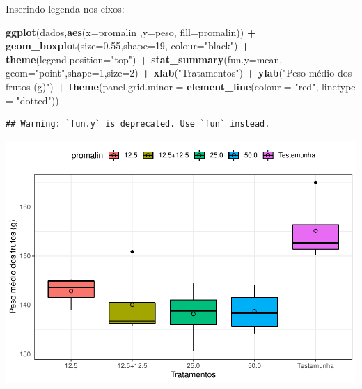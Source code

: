 \documentclass[
]{book}
\newenvironment{Shaded}{\begin{snugshade}}{\end{snugshade}}
\newcommand{\DataTypeTok}[1]{\textcolor[rgb]{0.13,0.29,0.53}{#1}}
\newcommand{\DecValTok}[1]{\textcolor[rgb]{0.00,0.00,0.81}{#1}}
\newcommand{\FloatTok}[1]{\textcolor[rgb]{0.00,0.00,0.81}{#1}}
\newcommand{\KeywordTok}[1]{\textcolor[rgb]{0.13,0.29,0.53}{\textbf{#1}}}
\newcommand{\NormalTok}[1]{#1}
\newcommand{\OperatorTok}[1]{\textcolor[rgb]{0.81,0.36,0.00}{\textbf{#1}}}
\newcommand{\StringTok}[1]{\textcolor[rgb]{0.31,0.60,0.02}{#1}}
\begin{document}
Inserindo legenda nos eixos:

\begin{Shaded}
\begin{Highlighting}[]
\KeywordTok{ggplot}\NormalTok{(dados,}\KeywordTok{aes}\NormalTok{(}\DataTypeTok{x=}\NormalTok{promalin ,}\DataTypeTok{y=}\NormalTok{peso, }\DataTypeTok{fill=}\NormalTok{promalin)) }\OperatorTok{+}\StringTok{ }
\StringTok{      }\KeywordTok{geom_boxplot}\NormalTok{(}\DataTypeTok{size=}\FloatTok{0.55}\NormalTok{,}\DataTypeTok{shape=}\DecValTok{19}\NormalTok{, }\DataTypeTok{colour=}\StringTok{"black"}\NormalTok{) }\OperatorTok{+}\StringTok{ }
\StringTok{      }\KeywordTok{theme}\NormalTok{(}\DataTypeTok{legend.position=}\StringTok{"top"}\NormalTok{) }\OperatorTok{+}\StringTok{ }
\StringTok{      }\KeywordTok{stat_summary}\NormalTok{(}\DataTypeTok{fun.y=}\NormalTok{mean, }\DataTypeTok{geom=}\StringTok{"point"}\NormalTok{,}\DataTypeTok{shape=}\DecValTok{1}\NormalTok{,}\DataTypeTok{size=}\DecValTok{2}\NormalTok{) }\OperatorTok{+}\StringTok{ }
\StringTok{      }\KeywordTok{xlab}\NormalTok{(}\StringTok{"Tratamentos"}\NormalTok{) }\OperatorTok{+}\StringTok{  }
\StringTok{      }\KeywordTok{ylab}\NormalTok{(}\StringTok{"Peso médio dos frutos (g)"}\NormalTok{)  }\OperatorTok{+}
\StringTok{      }\KeywordTok{theme}\NormalTok{(}\DataTypeTok{panel.grid.minor =} \KeywordTok{element_line}\NormalTok{(}\DataTypeTok{colour =} \StringTok{"red"}\NormalTok{, }\DataTypeTok{linetype =} \StringTok{"dotted"}\NormalTok{)) }
\end{Highlighting}
\end{Shaded}

\begin{verbatim}
## Warning: `fun.y` is deprecated. Use `fun` instead.
\end{verbatim}

\includegraphics{TudodoR_files/figure-latex/unnamed-chunk-238-1.pdf}
\end{document}
